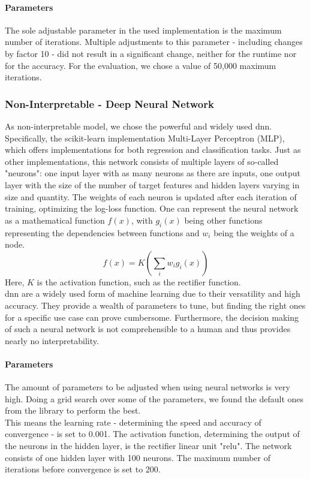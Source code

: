 \documentclass[conference,comsoc]{IEEEtran}
\begin{document}
\paragraph*{Parameters}
The sole adjustable parameter in the used implementation is the maximum number of iterations. 
Multiple adjustments to this parameter - including changes by factor 10 - did not result in a significant change, neither for the runtime nor for the accuracy. 
For the evaluation, we chose a value of 50,000 maximum iterations.

\subsubsection{Non-Interpretable - Deep Neural Network}
As non-interpretable model, we chose the powerful and widely used \gls{dnn}. 
Specifically, the scikit-learn implementation Multi-Layer Perceptron (MLP), which offers implementations for both regression and classification tasks.
Just as other implementations, this network consists of multiple layers of so-called "neurons": one input layer with as many neurons as there are inputs, one output layer with the size of the number of target features and hidden layers varying in size and quantity. 
The weights of each neuron is updated after each iteration of training, optimizing the log-loss function. 
One can represent the neural network as a mathematical function $f(x)$, with $g_i (x)$ being other functions representing the dependencies between functions and $w_i$ being the weights of a node. 
\begin{equation}
f(x) = K(\sum _i w_i g_i (x))
\end{equation}
Here, $K$ is the activation function, such as the rectifier function. \\
\gls{dnn} are a widely used form of machine learning due to their versatility and high accuracy.
They provide a wealth of parameters to tune, but finding the right ones for a specific use case can prove cumbersome.
Furthermore, the decision making of such a neural network is not comprehensible to a human and thus provides nearly no interpretability.
\paragraph*{Parameters}
The amount of parameters to be adjusted when using neural networks is very high.
Doing a grid search over some of the parameters, we found the default ones from the library to perform the best.\\
This means the learning rate - determining the speed and accuracy of convergence - is set to 0.001. 
The activation function, determining the output of the neurons in the hidden layer, is the rectifier linear unit "relu". 
The network consists of one hidden layer with 100 neurons. 
The maximum number of iterations before convergence is set to 200.
\end{document}
